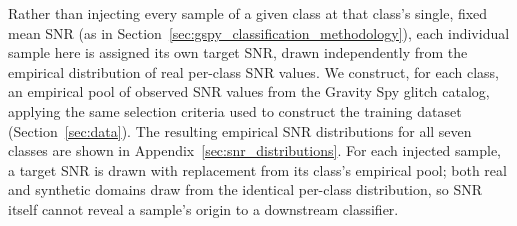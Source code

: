 \documentclass[reprint,nofootinbib,amsmath,amssymb,aps,floatfix]{revtex4-2}
\begin{document}

Rather than injecting every sample of a given class at that class's single, fixed mean SNR (as in Section~\ref{sec:gspy_classification_methodology}), each individual sample here is assigned its own target SNR, drawn independently from the empirical distribution of real per-class SNR values. 
We construct, for each class, an empirical pool of observed SNR values from the Gravity Spy glitch catalog, applying the same selection criteria used to construct the training dataset (Section~\ref{sec:data}). 
The resulting empirical SNR distributions for all seven classes are shown in Appendix~\ref{sec:snr_distributions}.
For each injected sample, a target SNR is drawn with replacement from its class's empirical pool; both real and synthetic domains draw from the identical per-class distribution, so SNR itself cannot reveal a sample's origin to a downstream classifier. 
\end{document}
